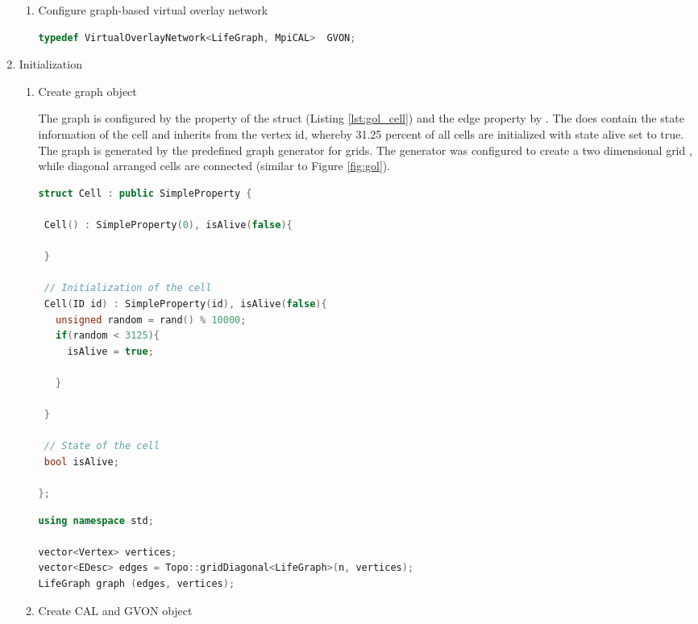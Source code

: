 \begin{enumerate}
\begin{enumerate}
\item Configure graph-based virtual overlay network

  \begin{lstlisting}[language=C++, label=lst:conf_gvon]
typedef VirtualOverlayNetwork<LifeGraph, MpiCAL>  GVON;
  \end{lstlisting}

\end{enumerate}

\item Initialization
  \begin{enumerate}
  
  \item Create graph object


    The graph is configured by the property of the  struct
    (Listing \ref{lst:gol_cell}) and the edge property by
     .  The  does contain the state
    information of the cell and inherits from  the
    vertex id, whereby 31.25 percent of all cells are initialized with
    state alive set to true.  The graph is generated by the predefined
    graph generator for grids. The generator was configured to create a
    two dimensional grid , while diagonal arranged cells are connected
    (similar to Figure \ref{fig:gol}).

    \begin{lstlisting}[language=C++, label=lst:gol_cell]
struct Cell : public SimpleProperty { 

 Cell() : SimpleProperty(0), isAlive(false){ 
          
 }
        
 // Initialization of the cell
 Cell(ID id) : SimpleProperty(id), isAlive(false){ 
   unsigned random = rand() % 10000;
   if(random < 3125){ 
     isAlive = true;
     
   }
   
 }

 // State of the cell
 bool isAlive;
 
};
    \end{lstlisting}

  \begin{lstlisting}[language=C++, label=lst:]
using namespace std;

vector<Vertex> vertices;
vector<EDesc> edges = Topo::gridDiagonal<LifeGraph>(n, vertices);
LifeGraph graph (edges, vertices); 
  \end{lstlisting}

\item Create CAL and GVON object


\end{enumerate}
\end{enumerate}
